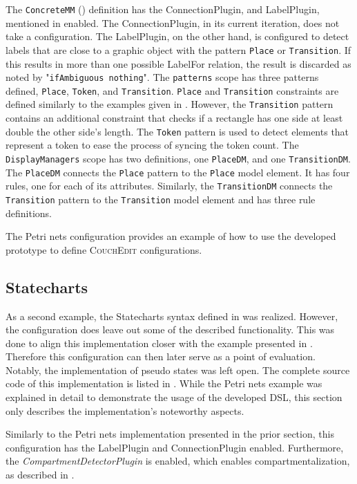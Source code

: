 The \texttt{ConcreteMM} () definition has the ConnectionPlugin, and LabelPlugin, mentioned in  enabled. The ConnectionPlugin, in its current iteration, does not take a configuration. The LabelPlugin, on the other hand, is configured to detect labels that are close to a graphic object with the pattern \texttt{Place} or \texttt{Transition}. If this results in more than one possible LabelFor relation, the result is discarded as noted by "\texttt{ifAmbiguous nothing}". The \texttt{patterns} scope has three patterns defined, \texttt{Place}, \texttt{Token}, and \texttt{Transition}. \texttt{Place} and \texttt{Transition} constraints are defined similarly to the examples given in . However, the \texttt{Transition} pattern contains an additional constraint that checks if a rectangle has one side at least double the other side's length.  The \texttt{Token} pattern is used to detect elements that represent a token to ease the process of syncing the token count. The \texttt{DisplayManagers} scope has two definitions, one \texttt{PlaceDM}, and one \texttt{TransitionDM}. The \texttt{PlaceDM} connects the \texttt{Place} pattern to the \texttt{Place} model element. It has four rules, one for each of its attributes. Similarly, the \texttt{TransitionDM} connects the \texttt{Transition} pattern to the \texttt{Transition} model element and has three rule definitions.

The Petri nets configuration provides an example of how to use the developed prototype to define \textsc{CouchEdit} configurations. 

\subsection{Statecharts}
\label{sec:state-impl}
As a second example, the Statecharts syntax defined in  was realized. However, the configuration does leave out some of the described functionality. This was done to align this implementation closer with the example presented in \cite{nachreiner_couchedit_2020}. Therefore this configuration can then later serve as a point of evaluation. Notably, the implementation of pseudo states was left open. The complete source code of this implementation is listed in . While the Petri nets example was explained in detail to demonstrate the usage of the developed DSL, this section only describes the implementation's noteworthy aspects.

Similarly to the Petri nets implementation presented in the prior section, this configuration has the LabelPlugin and ConnectionPlugin enabled. Furthermore, the \emph{CompartmentDetectorPlugin} is enabled, which enables compartmentalization, as described in .

